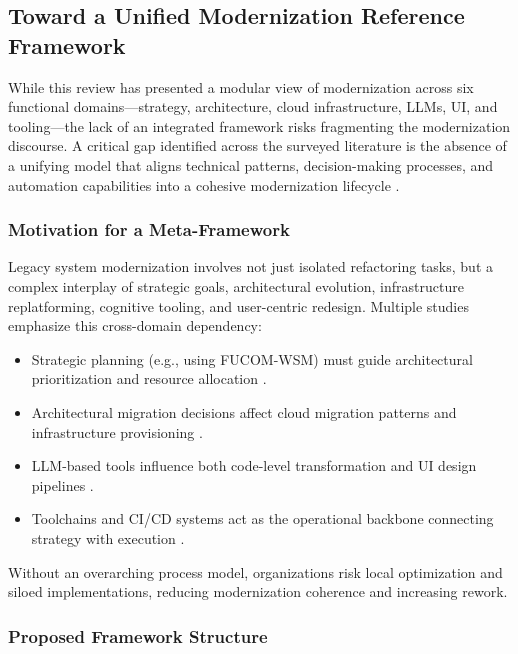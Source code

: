 \documentclass[12pt]{article}
\begin{document}
\subsection{Toward a Unified Modernization Reference Framework}

While this review has presented a modular view of modernization across six functional domains—strategy, architecture, cloud infrastructure, LLMs, UI, and tooling—the lack of an integrated framework risks fragmenting the modernization discourse. A critical gap identified across the surveyed literature is the absence of a unifying model that aligns technical patterns, decision-making processes, and automation capabilities into a cohesive modernization lifecycle \cite{assuncao2025, wolfart2021}.

\subsubsection{Motivation for a Meta-Framework}

Legacy system modernization involves not just isolated refactoring tasks, but a complex interplay of strategic goals, architectural evolution, infrastructure replatforming, cognitive tooling, and user-centric redesign. Multiple studies emphasize this cross-domain dependency:

\begin{itemize}
    \item Strategic planning (e.g., using FUCOM-WSM) must guide architectural prioritization and resource allocation \cite{jomhari2024}.
    \item Architectural migration decisions affect cloud migration patterns and infrastructure provisioning \cite{hasan2023, tuusjarvi2024}.
    \item LLM-based tools influence both code-level transformation and UI design pipelines \cite{geng2024, wu2024uicoder}.
    \item Toolchains and CI/CD systems act as the operational backbone connecting strategy with execution \cite{googlemigrate2025}.
\end{itemize}

Without an overarching process model, organizations risk local optimization and siloed implementations, reducing modernization coherence and increasing rework.

\subsubsection{Proposed Framework Structure}
\end{document}
